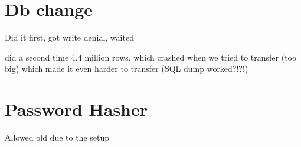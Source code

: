 \documentclass[report/main.tex]{subfiles}
\begin{document}
    \section{Db change}
        Did it first, got write denial, waited 
        
        did a second time 4.4 million rows, which crashed when we tried to transfer (too big) which made it even harder to transfer (SQL dump worked?!?!)

    \section{Password Hasher}
        Allowed old due to the setup
\end{document}

